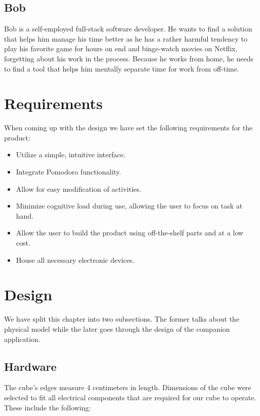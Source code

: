\documentclass{article}
\begin{document}
\subsection{Bob}

Bob is a self-employed full-stack software developer. He wants to find a solution that helps him manage his time better as he has a rather harmful tendency to play his favorite game for hours on end and binge-watch movies on Netflix, forgetting about his work in the process. Because he works from home, he needs to find a tool that helps him mentally separate time for work from off-time.

\newpage

\section{Requirements}

When coming up with the design we have set the following requirements for the product:

\begin{itemize}
\item Utilize a simple, intuitive interface.
\item Integrate Pomodoro functionality.
\item Allow for easy modification of activities.
\item Minimize cognitive load during use, allowing the user to focus on task at hand.
\item Allow the user to build the product using off-the-shelf parts and at a low cost.
\item House all necessary electronic devices.
\end{itemize}

\section{Design}

We have split this chapter into two subsections. The former talks about the physical model while the later goes through the design of the companion application.

\subsection{Hardware}

The cube's edges measure 4 centimeters in length. Dimensions of the cube were selected to fit all electrical components that are required for our cube to operate. These include the following:
\end{document}

